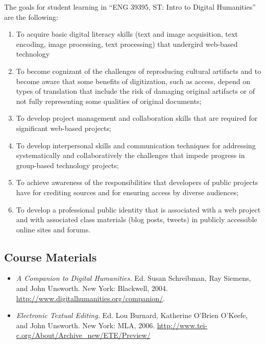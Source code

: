 \documentclass[]{article}
\begin{document}
The goals for student learning in ``ENG 39395, ST: Intro to Digital
Humanities'' are the following:

\begin{enumerate}
\def\labelenumi{\arabic{enumi}.}
\itemsep1pt\parskip0pt
\item
  To acquire basic digital literacy skills (text and image acquisition,
  text encoding, image processing, text processing) that undergird
  web-based technology
\item
  To become cognizant of the challenges of reproducing cultural
  artifacts and to become aware that some benefits of digitization, such
  as access, depend on types of translation that include the risk of
  damaging original artifacts or of not fully representing some
  qualities of original documents;
\item
  To develop project management and collaboration skills that are
  required for significant web-based projects;
\item
  To develop interpersonal skills and communication techniques for
  addressing systematically and collaboratively the challenges that
  impede progress in group-based technology projects;
\item
  To achieve awareness of the responsibilities that developers of public
  projects have for crediting sources and for ensuring access by diverse
  audiences;
\item
  To develop a professional public identity that is associated with a
  web project and with associated class materials (blog posts, tweets)
  in publicly accessible online sites and forums.
\end{enumerate}

\subsection{Course Materials}\label{course-materials}

\begin{itemize}
\itemsep1pt\parskip0pt
\item
  \emph{A Companion to Digital Humanities.} Ed. Susan Schreibman, Ray
  Siemens, and John Unsworth. New York: Blackwell, 2004.
  \url{http://www.digitalhumanities.org/companion/}.
\item
  \emph{Electronic Textual Editing.} Ed. Lou Burnard, Katherine O'Brien
  O'Keefe, and John Unsworth. New York: MLA, 2006.
  \url{http://www.tei-c.org/About/Archive_new/ETE/Preview/}
\end{itemize}
\end{document}
